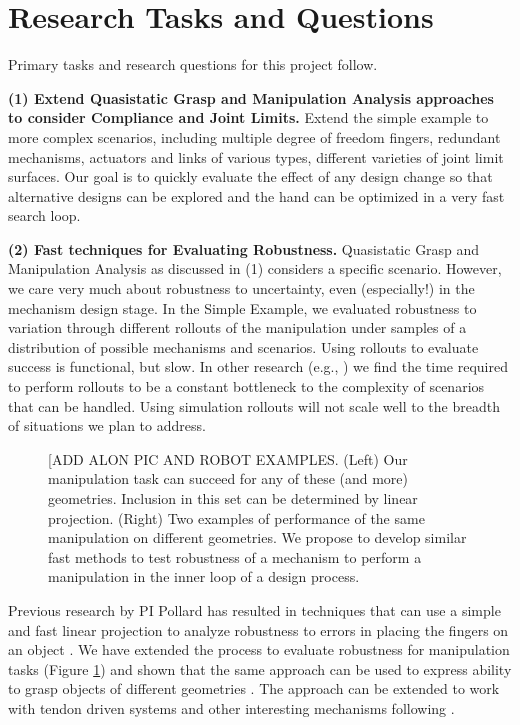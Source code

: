 \section{Research Tasks and Questions}

Primary tasks and research questions for this project follow.

\smallskip\noindent
{\bf (1) Extend Quasistatic Grasp and Manipulation Analysis approaches to consider Compliance and Joint Limits.}  Extend the simple example to more complex scenarios, including multiple degree of freedom fingers, redundant mechanisms, actuators and links of various types, different varieties of joint limit surfaces.   Our goal is to quickly evaluate the effect of any design change so that alternative designs can be explored and the hand can be optimized in a very fast search loop.

\smallskip\noindent
{\bf (2) Fast techniques for Evaluating Robustness.}   Quasistatic Grasp and Manipulation Analysis as discussed in (1) considers a specific scenario.   However, we care very much about robustness to uncertainty, even (especially!) in the mechanism design stage.  In the Simple Example, we evaluated robustness to variation through different rollouts of the manipulation under samples of a distribution of possible mechanisms and scenarios.   Using rollouts to evaluate success is functional, but slow.   In other research (e.g., \cite{koval2016pre}) we find the time required to perform rollouts to be a constant bottleneck to the complexity of scenarios that can be handled.   Using simulation rollouts will not scale well to the breadth of situations we plan to address.

\begin{figure}
\begin{center}
\vspace*{2in}
\end{center}
\caption[]{[ADD ALON PIC AND ROBOT EXAMPLES.  (Left) Our manipulation task can succeed for any of these (and more) geometries.   Inclusion in this set can be determined by linear projection.   (Right) Two examples of performance of the same manipulation on different geometries.   We propose to develop similar fast methods to test robustness of a mechanism to perform a manipulation in the inner loop of a design process.}
\label{AlonManip}
\end{figure}


Previous research by PI Pollard has resulted in techniques that can use a simple and fast linear projection to analyze robustness to errors in placing the fingers on an object \cite{pollard2004closure}.   We have extended the process to evaluate robustness for manipulation tasks \cite{Pollard:WAFR02} (Figure \ref{AlonManip}) and shown that the same approach can be used to express ability to grasp objects of different geometries \cite{pollard20045}.   The approach can be extended to work with tendon driven systems and other interesting mechanisms following  \cite{Li:graspDB07}.

